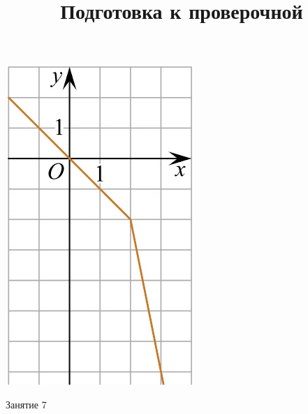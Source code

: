 \begin{homework}[number=3]
\begin{listofex}
\begin{minipage}[c]{0.1\textwidth}
				\includegraphics[align=t, width=\textwidth]{../../pics/G101M4C5-9.jpg}
			\end{minipage}
		\end{listofex}
	\end{homework}
	
	\begin{class}[number=7]
		\title{Подготовка к проверочной}
		\begin{listofex}
			\item Занятие 7
		\end{listofex}
	\end{class}
	
